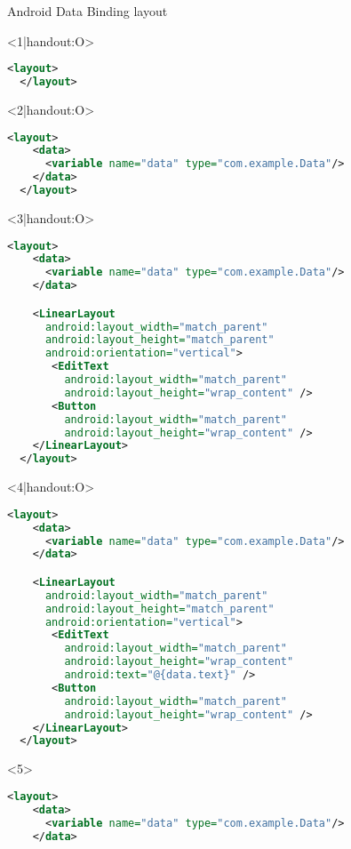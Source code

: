\begin{frame}[fragile]{Android Data Binding layout}
\begin{onlyenv}<1|handout:O>
  \begin{lstlisting}[language=XML]
  <layout>
  </layout>
  \end{lstlisting}
\end{onlyenv}
\begin{onlyenv}<2|handout:O>
  \begin{lstlisting}[language=XML]
  <layout>
    <data>
      <variable name="data" type="com.example.Data"/>
    </data>
  </layout>
  \end{lstlisting}
\end{onlyenv}
\begin{onlyenv}<3|handout:O>
  \begin{lstlisting}[language=XML]
  <layout>
    <data>
      <variable name="data" type="com.example.Data"/>
    </data>

    <LinearLayout
      android:layout_width="match_parent"
      android:layout_height="match_parent"
      android:orientation="vertical">
       <EditText
         android:layout_width="match_parent"
         android:layout_height="wrap_content" />
       <Button
         android:layout_width="match_parent"
         android:layout_height="wrap_content" />
    </LinearLayout>
  </layout>
  \end{lstlisting}
\end{onlyenv}
\begin{onlyenv}<4|handout:O>
  \begin{lstlisting}[language=XML]
  <layout>
    <data>
      <variable name="data" type="com.example.Data"/>
    </data>

    <LinearLayout
      android:layout_width="match_parent"
      android:layout_height="match_parent"
      android:orientation="vertical">
       <EditText
         android:layout_width="match_parent"
         android:layout_height="wrap_content"
         android:text="@{data.text}" />
       <Button
         android:layout_width="match_parent"
         android:layout_height="wrap_content" />
    </LinearLayout>
  </layout>
  \end{lstlisting}
\end{onlyenv}
\begin{onlyenv}<5>
  \begin{lstlisting}[language=XML]
  <layout>
    <data>
      <variable name="data" type="com.example.Data"/>
    </data>


\end{lstlisting}
\end{onlyenv}
\end{frame}
